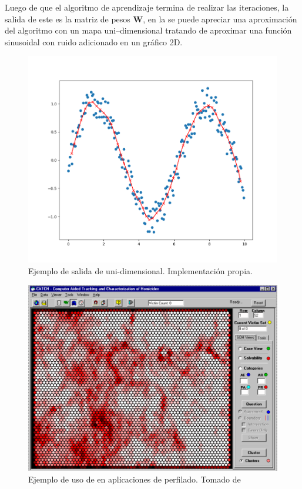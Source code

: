 Luego de que el algoritmo de aprendizaje termina de realizar las iteraciones, la salida de este es la matriz de pesos $\mathbf{W}$, en la  se puede apreciar una aproximación del algoritmo con un mapa uni--dimensional tratando de aproximar una función sinusoidal con ruido adicionado en un gráfico 2D.


\begin{figure}[H]
\centering
\includegraphics[scale=0.5]{Figures/som-implementation-example.png}
\decoRule
\caption[Ejemplo de salida de  uni-dimensional]{Ejemplo de salida de  uni-dimensional. Implementación propia.}
\label{fig:som-impl-example}
\end{figure}

\begin{figure}[H]
\centering
\includegraphics[scale=0.3]{Figures/som-example.png}
\decoRule
\caption[Ejemplo de uso de  en aplicaciones de perfilado]{Ejemplo de uso de  en aplicaciones de perfilado. Tomado de \cite{mena2003investigative}}
\label{fig:som-example}
\end{figure}

